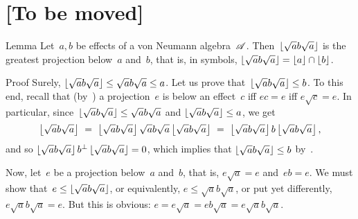 \documentclass[a]{subfiles}
\begin{document}
\section{[To be moved]}
%
%
%
\begin{parsec}%
\begin{point}{Lemma}%
Let~$a,b$ be effects of a von Neumann algebra~$\mathscr{A}$.
Then~$\left\lfloor\sqrt{a}b\sqrt{a}\right\rfloor$ is the greatest projection
below~$a$ and~$b$, that is, in symbols, 
$\left\lfloor\sqrt{a}b\sqrt{a}\right\rfloor=\left\lfloor a\right\rfloor\cap \left\lfloor b\right\rfloor$.
\end{point}
\begin{point}{Proof}%
Surely, $\left\lfloor\sqrt{a}b\sqrt{a}\right\rfloor\leq \sqrt{a}b\sqrt{a} \leq a$.
Let us prove that~$\left\lfloor\sqrt{a}b\sqrt{a}\right\rfloor\leq b$.
To this end,
recall
that (by~)
a projection~$e$ is below an effect~$c$
iff $ec=e$ iff $e\sqrt{c}=e$.
In particular,
since~$\left\lfloor\sqrt{a}b\sqrt{a}\right\rfloor\leq \sqrt{a}b\sqrt{a}$ and 
$\left\lfloor\sqrt{a}b\sqrt{a}\right\rfloor\leq a$,
we get
\begin{equation*}
\floor{\sqrt{a}b\sqrt{a}}
\ =\ \floor{\sqrt{a}b\sqrt{a}}\sqrt{a}b\sqrt{a}\floor{\sqrt{a}b\sqrt{a}} \ =\ 
\floor{\sqrt{a}b\sqrt{a}}b\floor{\sqrt{a}b\sqrt{a}},
\end{equation*}
and so $\left\lfloor\sqrt{a}b\sqrt{a}\right\rfloor b^\perp\left\lfloor\sqrt{a}b\sqrt{a}\right\rfloor=0$,
which implies that
$\left\lfloor\sqrt{a}b\sqrt{a}\right\rfloor\leq b$ by~.
\begin{point}%
Now,
let~$e$ be a projection below~$a$ and~$b$,
that is, $e\sqrt{a}=e$ and~$eb=e$.
We must show that~$e\leq \left\lfloor\sqrt{a}b\sqrt{a}\right\rfloor$,
or equivalently, $e\leq \sqrt{a}b\sqrt{a}$,
or put yet differently, $e\sqrt{a}b\sqrt{a}=e$.
But this is obvious: $e=e\sqrt{a}=eb\sqrt{a}=e\sqrt{a}b\sqrt{a}$.
\end{point}
\end{point}
\end{parsec}
\end{document}
